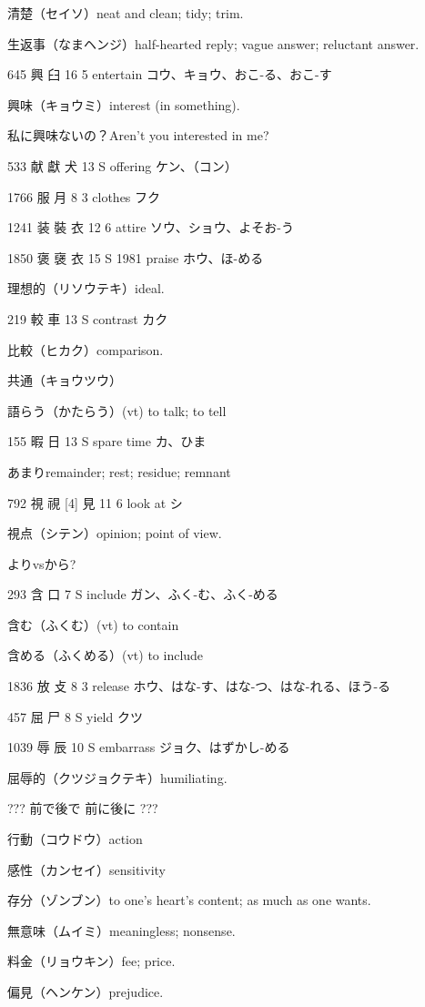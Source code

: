 清楚（セイソ）neat and clean; tidy; trim.

生返事（なまヘンジ）half-hearted reply; vague answer; reluctant answer.

645	興		臼	16	5		entertain	コウ、キョウ、おこ-る、おこ-す

興味（キョウミ）interest (in something).

私に興味ないの？Aren't you interested in me?

533	献	獻	犬	13	S		offering	ケン、（コン）

1766	服		月	8	3		clothes	フク

1241	装	裝	衣	12	6		attire	ソウ、ショウ、よそお-う

1850	褒	襃	衣	15	S	1981	praise	ホウ、ほ-める

理想的（リソウテキ）ideal.

219	較		車	13	S		contrast	カク

比較（ヒカク）comparison.

共通（キョウツウ）

語らう（かたらう）(vt) to talk; to tell

155	暇		日	13	S		spare time	カ、ひま

あまりremainder; rest; residue; remnant

792	視	視 [4]	見	11	6		look at	シ

視点（シテン）opinion; point of view.

よりvsから?

293	含		口	7	S		include	ガン、ふく-む、ふく-める

含む（ふくむ）(vt) to contain

含める（ふくめる）(vt) to include

1836	放		攴	8	3		release	ホウ、はな-す、はな-つ、はな-れる、ほう-る

457	屈		尸	8	S		yield	クツ

1039	辱		辰	10	S		embarrass	ジョク、はずかし-める

屈辱的（クツジョクテキ）humiliating.

???
前で後で
前に後に
???

行動（コウドウ）action

感性（カンセイ）sensitivity

存分（ゾンブン）to one's heart's content; as much as one wants.

無意味（ムイミ）meaningless; nonsense.

料金（リョウキン）fee; price.

偏見（ヘンケン）prejudice.

